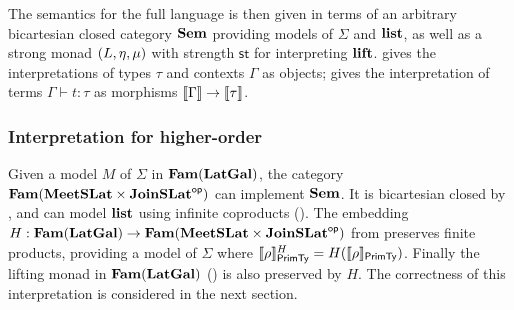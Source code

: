 The semantics for the full language is then given in terms of an arbitrary bicartesian closed category $\mathbf{Sem}$
providing models of $\Sigma$ and $\mathbf{list}$, as well as a strong monad $(L, \eta, \mu)$ with strength
$\mathsf{st}$ for interpreting $\mathbf{lift}$.  gives the interpretations of types $\tau$
and contexts $\Gamma$ as objects;  gives the interpretation of terms $\Gamma \vdash t:
\tau$ as morphisms $\llbracket \Gamma \rrbracket \to \llbracket \tau \rrbracket$.

\subsubsection{Interpretation for higher-order \GPS}

Given a model $M$ of $\Sigma$ in $\mathbf{Fam}(\mathbf{LatGal})$, the category $\mathbf{Fam}(\mathbf{MeetSLat} \times \mathbf{JoinSLat}^{\mathsf{op}})$ can
implement $\mathbf{Sem}$. It is bicartesian closed by , and can model $\mathbf{list}$ using infinite
coproducts (). The embedding $H: \mathbf{Fam}(\mathbf{LatGal}) \to
\mathbf{Fam}(\mathbf{MeetSLat} \times \mathbf{JoinSLat}^{\mathsf{op}})$ from  preserves finite products, providing a model
of $\Sigma$ where $\llbracket \rho \rrbracket^H_{\mathsf{PrimTy}} = H(\llbracket \rho \rrbracket_{\mathsf{PrimTy}})$. Finally the lifting monad in
$\mathbf{Fam}(\mathbf{LatGal})$ () is also preserved by $H$. The correctness of this
interpretation is considered in the next section.
